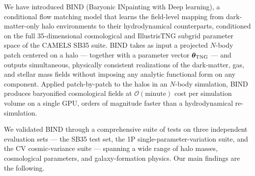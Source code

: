 \documentclass[linenumbers,trackchanges, twocolumn]{aastex701}
\begin{document}
We have introduced \textsc{BIND} (Baryonic INpainting with Deep learning), a conditional flow matching model that learns the field-level mapping from dark-matter-only halo environments to their hydrodynamical counterparts, conditioned on the full 35-dimensional cosmological and IllustrisTNG subgrid parameter space of the CAMELS SB35 suite. \textsc{BIND} takes as input a projected $N$-body patch centered on a halo --- together with a parameter vector $\boldsymbol{\theta}_{\rm TNG}$ --- and outputs simultaneous, physically consistent realizations of the dark-matter, gas, and stellar mass fields without imposing any analytic functional form on any component. Applied patch-by-patch to the halos in an $N$-body simulation, \textsc{BIND} produces baryonified cosmological fields at $\mathcal{O}(\mathrm{minute})$ cost per simulation volume on a single GPU, orders of magnitude faster than a hydrodynamical re-simulation.

We validated \textsc{BIND} through a comprehensive suite of tests on three independent evaluation sets --- the SB35 test set, the 1P single-parameter-variation suite, and the CV cosmic-variance suite --- spanning a wide range of halo masses, cosmological parameters, and galaxy-formation physics. Our main findings are the following.
\end{document}
